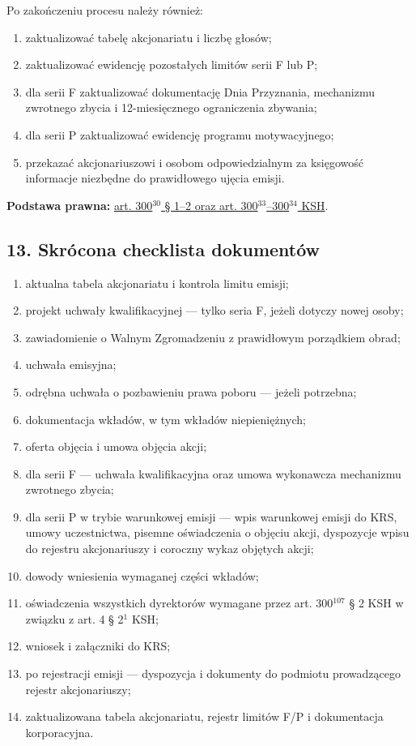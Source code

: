 \documentclass[12pt,a4paper]{report}
\begin{document}
Po zakończeniu procesu należy również:
\begin{enumerate}
  \item zaktualizować tabelę akcjonariatu i liczbę głosów;
  \item zaktualizować ewidencję pozostałych limitów serii F lub P;
  \item dla serii F zaktualizować dokumentację Dnia Przyznania, mechanizmu zwrotnego zbycia i 12-miesięcznego ograniczenia zbywania;
  \item dla serii P zaktualizować ewidencję programu motywacyjnego;
  \item przekazać akcjonariuszowi i osobom odpowiedzialnym za księgowość informacje niezbędne do prawidłowego ujęcia emisji.
\end{enumerate}

\textbf{Podstawa prawna:} \href{https://eli.gov.pl/api/acts/DU/2024/18/text.html}{art. 300$^{30}$ § 1--2 oraz art. 300$^{33}$--300$^{34}$ KSH}.

\subsection*{13. Skrócona checklista dokumentów}

\begin{enumerate}
  \item aktualna tabela akcjonariatu i kontrola limitu emisji;
  \item projekt uchwały kwalifikacyjnej --- tylko seria F, jeżeli dotyczy nowej osoby;
  \item zawiadomienie o Walnym Zgromadzeniu z prawidłowym porządkiem obrad;
  \item uchwała emisyjna;
  \item odrębna uchwała o pozbawieniu prawa poboru --- jeżeli potrzebna;
  \item dokumentacja wkładów, w tym wkładów niepieniężnych;
  \item oferta objęcia i umowa objęcia akcji;
  \item dla serii F --- uchwała kwalifikacyjna oraz umowa wykonawcza mechanizmu zwrotnego zbycia;
  \item dla serii P w trybie warunkowej emisji --- wpis warunkowej emisji do KRS, umowy uczestnictwa, pisemne oświadczenia o objęciu akcji, dyspozycje wpisu do rejestru akcjonariuszy i coroczny wykaz objętych akcji;
  \item dowody wniesienia wymaganej części wkładów;
  \item oświadczenia wszystkich dyrektorów wymagane przez art. 300$^{107}$ § 2 KSH w związku z art. 4 § 2$^{1}$ KSH;
  \item wniosek i załączniki do KRS;
  \item po rejestracji emisji --- dyspozycja i dokumenty do podmiotu prowadzącego rejestr akcjonariuszy;
  \item zaktualizowana tabela akcjonariatu, rejestr limitów F/P i dokumentacja korporacyjna.
\end{enumerate}
\end{document}
